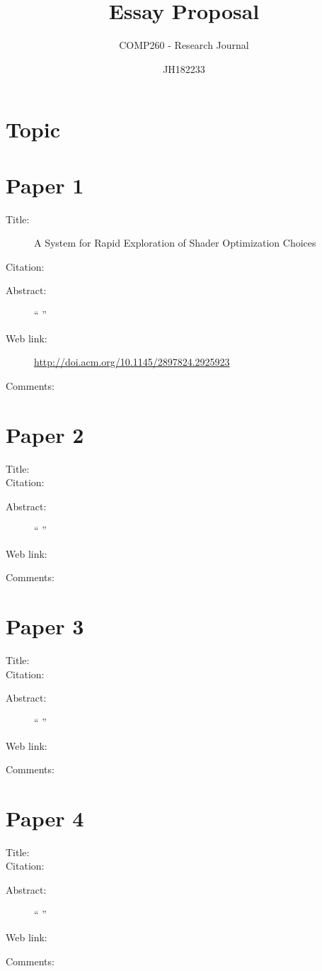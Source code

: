 \documentclass{scrartcl}
\title{Essay Proposal}
\subtitle{COMP260 - Research Journal}
\author{JH182233}
\begin{document}
	
	
	\maketitle
	\section*{Topic}
	
	
	\section*{Paper 1}
	\begin{description}
		\item[Title:]A System for Rapid Exploration of Shader Optimization Choices
		\item[Citation:] \cite{He}
		\item[Abstract:] ``
		''
		\item[Web link:] \url{http://doi.acm.org/10.1145/2897824.2925923}
		\item[Comments:]
	\end{description}
	
	\section*{Paper 2}
	\begin{description}
		\item[Title:]
		\item[Citation:] \cite{}
		\item[Abstract:] ``
		''
		\item[Web link:] \url{}
		\item[Comments:]
	\end{description}
	
	\section*{Paper 3}
	\begin{description}
		\item[Title:]
		\item[Citation:] \cite{}
		\item[Abstract:] ``
		''
		\item[Web link:] \url{}
		\item[Comments:]
	\end{description}
	
	\section*{Paper 4}
	\begin{description}
		\item[Title:]
		\item[Citation:] \cite{}
		\item[Abstract:] ``
		''
		\item[Web link:] \url{}
		\item[Comments:]
	\end{description}
	
\end{document}
